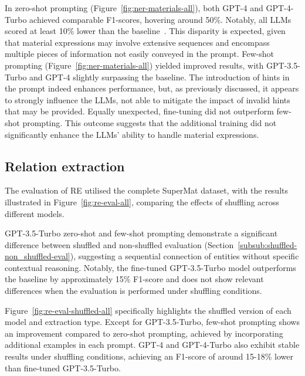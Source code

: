 In zero-shot prompting (Figure~\ref{fig:ner-materials-all}), both GPT-4 and GPT-4-Turbo achieved comparable F1-scores, hovering around 50\%. Notably, all LLMs scored at least 10\% lower than the baseline~\cite{lfoppiano2023automatic}. This disparity is expected, given that material expressions may involve extensive sequences and encompass multiple pieces of information not easily conveyed in the prompt.
Few-shot prompting (Figure~\ref{fig:ner-materials-all}) yielded improved results, with GPT-3.5-Turbo and GPT-4 slightly surpassing the baseline. 
The introduction of hints in the prompt indeed enhances performance, but, as previously discussed, it appears to strongly influence the LLMs, not able to mitigate the impact of invalid hints that may be provided.
Equally unexpected, fine-tuning did not outperform few-shot prompting. This outcome suggests that the additional training did not significantly enhance the LLMs' ability to handle material expressions.

\subsection{Relation extraction}
\label{sec:results-re}

The evaluation of RE utilised the complete SuperMat dataset, with the results illustrated in Figure~\ref{fig:re-eval-all}, comparing the effects of shuffling across different models. 


GPT-3.5-Turbo zero-shot and few-shot prompting demonstrate a significant difference between shuffled and non-shuffled evaluation (Section~\ref{subsub:shuffled-non_shuffled-eval}), suggesting a sequential connection of entities without specific contextual reasoning.
Notably, the fine-tuned GPT-3.5-Turbo model outperforms the baseline by approximately 15\% F1-score and does not show relevant differences when the evaluation is performed under shuffling conditions.

Figure~\ref{fig:re-eval-shuffled-all} specifically highlights the shuffled version of each model and extraction type. Except for GPT-3.5-Turbo, few-shot prompting shows an improvement compared to zero-shot prompting, achieved by incorporating additional examples in each prompt. 
GPT-4 and GPT-4-Turbo also exhibit stable results under shuffling conditions, achieving an F1-score of around 15-18\% lower than fine-tuned GPT-3.5-Turbo.

